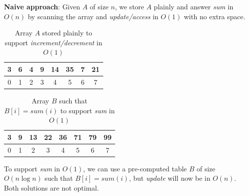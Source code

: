 \textbf{Naive approach}: Given $A$ of size $n$, we store $A$ plainly and answer \textit{sum} in $O(n)$ by scanning the array and \textit{update/access} in $O(1)$ with no extra space.
\begin{table}[H]
    \centering
    \begin{tabular}{|c|c|c|c|c|c|c|c|}\hline
         3 & 6 & 4 & 9 & 14 & 35 & 7 & 21 \\\hline 
         \multicolumn{1}{c}{0} & \multicolumn{1}{c}{1} & \multicolumn{1}{c}{2} & \multicolumn{1}{c}{3} & \multicolumn{1}{c}{4} & \multicolumn{1}{c}{5} & \multicolumn{1}{c}{6} & \multicolumn{1}{c}{7} \\
    \end{tabular}
    \caption{Array $A$ stored plainly to support \textit{increment/decrement} in $O(1)$}
    \label{tab:array-A-plain}
\end{table}
\begin{table}[H]
    \centering
    \begin{tabular}{|c|c|c|c|c|c|c|c|} \hline
         3 & 9 & 13 & 22 & 36 & 71 & 79 & 99 \\\hline 
         \multicolumn{1}{c}{0} & \multicolumn{1}{c}{1} & \multicolumn{1}{c}{2} & \multicolumn{1}{c}{3} & \multicolumn{1}{c}{4} & \multicolumn{1}{c}{5} & \multicolumn{1}{c}{6} & \multicolumn{1}{c}{7} \\
    \end{tabular}
    \caption{Array $B$ such that $B[i] = sum(i)$  to support \textit{sum} in $O(1)$}
    \label{tab:array-B-precomputed}
\end{table}
To support \textit{sum} in $O(1)$, we can use a pre-computed table $B$ of size $O(n \log n)$ such that $B[i] = sum(i)$, but \textit{update} will now be in $O(n)$. Both solutions are not optimal.
